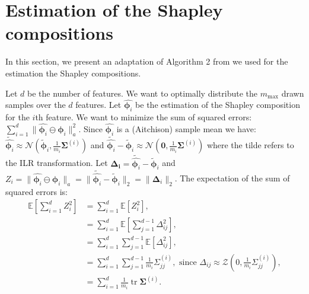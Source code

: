 \documentclass{article}
\theoremstyle{plain}
\theoremstyle{definition}
\theoremstyle{remark}
\DeclareMathOperator{\tr}{tr}
\begin{document}
\newpage
\section{Estimation of the Shapley compositions}
\label{app:algo}
In this section, we present an adaptation of Algorithm 2 from \cite{vstrumbelj2014explaining} we used for the estimation the Shapley compositions.

Let $d$ be the number of features. We want to optimally distribute the $m_{\text{max}}$ drawn samples over the $d$ features. Let $\hat{\bm{\phi}_i}$ be the estimation of the Shapley composition for the $i$th feature. We want to minimize the sum of squared errors: $\displaystyle\sum_{i=1}^{d} \| \hat{\bm{\phi}_i} \ominus \bm{\phi}_i \|_a^2$. Since $\hat{\bm{\phi}_i}$ is a (Aitchison) sample mean we have: $\tilde{\hat{\bm{\phi}_i}} \approx \mathcal{N}(\tilde{\bm{\phi}}_i, \frac{1}{m_i}\bm{\Sigma}^{(i)})$ and $\tilde{\hat{\bm{\phi}_i}} - \tilde{\bm{\phi}}_i \approx \mathcal{N}(\bm{0}, \frac{1}{m_i}\bm{\Sigma}^{(i)})$ where the tilde refers to the ILR transformation.
Let $\bm{\Delta_i} = \tilde{\hat{\bm{\phi}_i}} - \tilde{\bm{\phi}}_i$ and $Z_i = \| \hat{\bm{\phi}_i} \ominus \bm{\phi}_i \|_a = \| \tilde{\hat{\bm{\phi}_i}} - \tilde{\bm{\phi}}_i \|_2 = \| \bm{\Delta}_i \|_2$. The expectation of the sum of squared errors is:
\begin{equation}
  \begin{aligned}
    \mathbb{E}\left[ \sum_{i=1}^{d} Z_i^2 \right] &=   \sum_{i=1}^{d} \mathbb{E}\left[ Z_i^2 \right],\\
                                                  & =\sum_{i=1}^{d} \mathbb{E}\left[ \sum_{j=1}^{d-1}\Delta_{ij}^2 \right],\\
                                                  & =\sum_{i=1}^{d} \sum_{j=1}^{d-1} \mathbb{E}\left[\Delta_{ij}^2 \right],\\
                                                  & =\sum_{i=1}^{d} \sum_{j=1}^{d-1} \frac{1}{m_i}\Sigma_{jj}^{(i)}, \text{ since } \Delta_{ij}\approx \mathcal{Z}(0, \frac{1}{m_i}\Sigma_{jj}^{(i)}),\\
    &= \sum_{i=1}^d \frac{1}{m_i} \tr \bm{\Sigma}^{(i)}.
  \end{aligned}
\end{equation}
\end{document}
